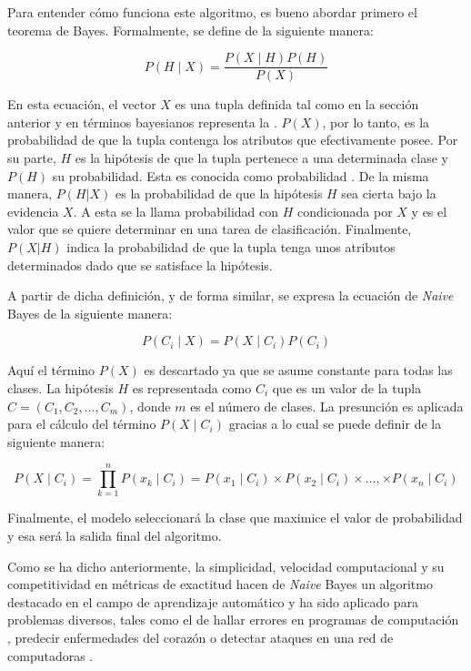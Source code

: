 Para entender cómo funciona este algoritmo, es bueno abordar primero  el teorema
de Bayes. Formalmente, se define de la siguiente manera:

\begin{equation}
   P(H \mid X) = \frac{P(X \mid H) P(H)}{P(X)}
\end{equation}

En esta ecuación, el vector $X$ es una tupla definida tal como en la sección
anterior y en términos bayesianos representa la . $P(X)$,
por lo tanto, es la probabilidad de que la tupla contenga los atributos que
efectivamente posee. Por su parte, $H$ es la hipótesis de que la tupla pertenece
a una determinada clase y $P(H)$ su probabilidad. Esta es conocida como
probabilidad . De la misma manera, $P(H|X)$ es la
probabilidad de que la hipótesis $H$ sea cierta bajo la evidencia $X$. A esta se
la llama probabilidad  con $H$ condicionada por $X$ y es
el valor que se quiere determinar en una tarea de clasificación.  Finalmente,
$P(X|H)$ indica la probabilidad de que la tupla tenga unos atributos
determinados dado que se satisface la hipótesis.

A partir de dicha definición, y de forma similar, se expresa la ecuación de
\textit{Naive} Bayes de la siguiente manera:  

\begin{equation} 
   P(C_{i} \mid X) = P(X \mid C_{i}) P(C_{i})
\end{equation}

Aquí el término $P(X)$ es descartado ya que se asume constante para todas las
clases. La hipótesis $H$ es representada como $C_{i}$ que es un valor de la
tupla $C=(C_{1},C_{2},\dots,C_{m})$, donde $m$ es el número de clases. La
presunción  es aplicada para el cálculo del término $P(X \mid
C_{i})$ gracias a lo cual se puede definir de la siguiente manera:

\begin{equation} 
   P(X \mid C_{i}) = \prod\limits_{k=1}^n{P(x_{k} \mid C_{i})} =
   P(x_{1} \mid C_{i}) \times 
   P(x_{2} \mid C_{i}) \times \dots, \times 
   P(x_{n} \mid C_{i})   
\end{equation}

Finalmente, el modelo seleccionará la clase que maximice el valor de
probabilidad y esa será la salida final del algoritmo.  

Como se ha dicho anteriormente, la simplicidad, velocidad computacional y su
competitividad en métricas de exactitud hacen de \textit{Naive} Bayes un
algoritmo destacado en el campo de aprendizaje automático
\cite{wickramasinghe_naive_2020} y ha sido aplicado para problemas diversos,
tales como el de hallar errores en programas de computación
\cite{arar_feature_2017}, predecir enfermedades del corazón
\cite{dulhare_prediction_2018} o detectar ataques en una red de computadoras
\cite{kalutarage_detecting_2015}.


